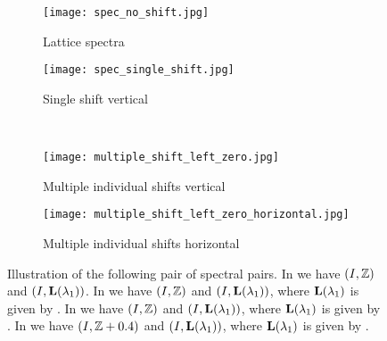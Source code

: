 


\begin{figure}[t]%
    \centering
    \begin{subfigure}{.47\textwidth}
        \centering
        \texttt{[image: spec\_no\_shift.jpg]}
        \caption{Lattice spectra}
        \label{fig:lattice_spectra}
    \end{subfigure}\quad
    \begin{subfigure}{.47\textwidth}
        \centering
        \texttt{[image: spec\_single\_shift.jpg]}
        \caption{Single shift vertical}
        \label{fig:single_shift_vertical}
    \end{subfigure}\\
    \begin{subfigure}{.47\textwidth}
        \centering
        \texttt{[image: multiple\_shift\_left\_zero.jpg]}
        \caption{Multiple individual shifts vertical}
        \label{fig:multiple_shift_vertical}
    \end{subfigure}\quad
    \begin{subfigure}{.47\textwidth}
        \centering
        \texttt{[image: multiple\_shift\_left\_zero\_horizontal.jpg]}
        \caption{Multiple individual shifts horizontal}
        \label{fig:multiple_shift_horizontal}
    \end{subfigure}
    \caption{Illustration of the following pair of spectral pairs. In  we have $(I,\mathbb{Z})$ and $(I,\mathbf{L}(\lambda_1))$.  In  we have $(I,\mathbb{Z})$ and $(I,\mathbf{L}(\lambda_1))$, where $\mathbf{L}(\lambda_1)$ is given by . In  we have $(I,\mathbb{Z})$ and $(I,\mathbf{L}(\lambda_1))$, where $\mathbf{L}(\lambda_1)$ is given by . In  we have $(I,\mathbb{Z}+0.4)$ and $(I,\mathbf{L}(\lambda_1))$, where $\mathbf{L}(\lambda_1)$ is given by .}
    \label{fig:spectra_figures}
\end{figure}
